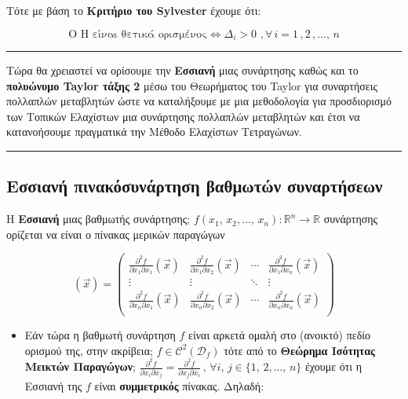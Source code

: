\documentclass[12pt]{article}
\providecommand{\tightlist}{%
      \setlength{\itemsep}{0pt}\setlength{\parskip}{0pt}}
\begin{document}
Τότε με βάση το \textbf{Κριτήριο του Sylvester} έχουμε ότι:

\begin{tcolorbox}
\[
\text{O Η είναι θετικά ορισμένος} \Leftrightarrow \Delta_i>0 \, \, , \forall \, i=1 \,, 2 \,, \dots, \, n \nonumber             \]
\end{tcolorbox}
    
\begin{center}\rule{0.5\linewidth}{0.5pt}\end{center}

Tώρα θα χρειαστεί να ορίσουμε την \textbf{Εσσιανή} μιας συνάρτησης καθώς
και το \textbf{πολυώνυμο Taylor τάξης 2} μέσω του Θεωρήματος του Taylor
για συναρτήσεις πολλαπλών μεταβλητών ώστε να καταλήξουμε με μια
μεθοδολογία για προσδιορισμό των Τοπικών Ελαχίστων μια συνάρτησης
πολλαπλών μεταβλητών και έτσι να κατανοήσουμε πραγματικά την Μέθοδο
Ελαχίστων Τετραγώνων.

\begin{center}\rule{0.5\linewidth}{0.5pt}\end{center}
    
\subsection{\texorpdfstring{{Εσσιανή πινακόσυνάρτηση βαθμωτών συναρτήσεων
}}{Εσσιανή πινακόσυνάρτηση βαθμωτών συναρτήσεων}}
H {\textbf{Εσσιανή}} μιας βαθμωτής συνάρτησης;
\(f(x_1, \, x_2, \dots, \, x_n): \mathbb{R}^n \longrightarrow \mathbb{R}\)
συνάρτησης ορίζεται να είναι ο πίνακας μερικών παραγώγων
\begin{tcolorbox}
\begin{equation*}
[Hf](\vec{x}) = \begin{pmatrix}
\frac{\partial^2f}{\partial x_1 \partial x_1}(\vec{x}) & \frac{\partial^2f}{\partial x_1 \partial x_2}(\vec{x}) & \cdots & \frac{\partial^2f}{\partial x_1 \partial x_n}(\vec{x}) \\
\vdots & \vdots & \ddots & \vdots \\
\frac{\partial^2f}{\partial x_n \partial x_1}(\vec{x}) & \frac{\partial^2f}{\partial x_n \partial x_2}(\vec{x}) & \cdots & \frac{\partial^2f}{\partial x_n \partial x_n}(\vec{x}) \\
\end{pmatrix}
\end{equation*}
\end{tcolorbox}

\begin{itemize}
\tightlist
\item
  Eάν τώρα η βαθμωτή συνάρτηση \(f\) είναι αρκετά ομαλή στο (ανοικτό)
  πεδίο ορισμού της, στην ακρίβεια;
  \(f \in \mathcal{C}^2(\mathcal{D}_f)\) τότε από το \textbf{Θεώρημα
  Ισότητας Μεικτών Παραγώγων};
  \(\frac{\partial^2f}{\partial x_i \partial x_j} = \frac{\partial^2f}{\partial x_j \partial x_i} \, , \, \forall i, \, j \in \{1, \, 2, \dots, \, n\}\)
  έχουμε ότι η Εσσιανή της \(f\) είναι \textbf{συμμετρικός} πίνακας.
  Δηλαδή:
\end{itemize}
\end{document}
